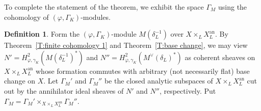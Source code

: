 \documentclass[12pt]{article}
\theoremstyle{definition}
\newtheorem{defn}[theorem]{Definition}
\numberwithin{equation}{theorem}
\newcommand{\dual}{\vee}
\newcommand{\an}{\mathrm{an}}
\begin{document}
To complete the statement of the theorem, we exhibit the space $\Gamma_M$ using the cohomology of $(\varphi, \Gamma_K)$-modules.

\begin{defn} \label{D:putative graph}
Form the $(\varphi, \Gamma_K)$-module $M(\delta_L^{-1})$ over $X \times_L X^{\an}_L$.
By Theorem~\ref{T:finite cohomology 1} and Theorem~\ref{T:base change},
we may view $N' = H^2_{\varphi, \gamma_K}(M(\delta_L^{-1})^*)$
and $N'' = H^2_{\varphi, \gamma_K}(M^\dual(\delta_L)^*)$
as coherent sheaves on $X \times_L X^{\an}_L$ whose formation commutes with arbitrary (not necessarily flat) base change on $X$.
Let $\Gamma_M'$ and $\Gamma_M''$ be the closed analytic subspaces of $X \times_L X^{\an}_L$ cut out by the annihilator ideal sheaves of $N'$ and $N''$, respectively. Put $\Gamma_M = \Gamma_M' \times_{X \times_L X^{\an}_L} \Gamma_M''$.
\end{defn}
\end{document}
